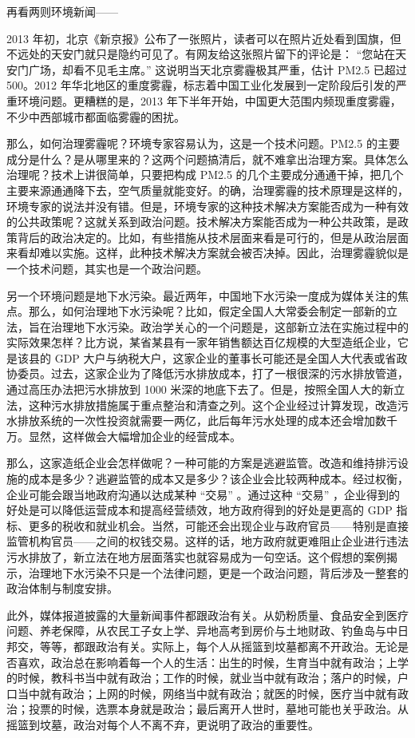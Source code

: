 再看两则环境新闻——

2013 年初，北京《新京报》公布了一张照片，读者可以在照片近处看到国旗，但不远处的天安门就只是隐约可见了。有网友给这张照片留下的评论是： “您站在天安门广场，却看不见毛主席。” 这说明当天北京雾霾极其严重，估计 PM2.5 已超过 500。2012 年华北地区的重度雾霾，标志着中国工业化发展到一定阶段后引发的严重环境问题。更糟糕的是，2013 年下半年开始，中国更大范围内频现重度雾霾，不少中西部城市都面临雾霾的困扰。

那么，如何治理雾霾呢？环境专家容易认为，这是一个技术问题。PM2.5 的主要成分是什么？是从哪里来的？这两个问题搞清后，就不难拿出治理方案。具体怎么治理呢？技术上讲很简单，只要把构成 PM2.5 的几个主要成分通通干掉，把几个主要来源通通降下去，空气质量就能变好。的确，治理雾霾的技术原理是这样的，环境专家的说法并没有错。但是，环境专家的这种技术解决方案能否成为一种有效的公共政策呢？这就关系到政治问题。技术解决方案能否成为一种公共政策，是政策背后的政治决定的。比如，有些措施从技术层面来看是可行的，但是从政治层面来看却难以实施。这样，此种技术解决方案就会被否决掉。因此，治理雾霾貌似是一个技术问题，其实也是一个政治问题。

另一个环境问题是地下水污染。最近两年，中国地下水污染一度成为媒体关注的焦点。那么，如何治理地下水污染呢？比如，假定全国人大常委会制定一部新的立法，旨在治理地下水污染。政治学关心的一个问题是，这部新立法在实施过程中的实际效果怎样？比方说，某省某县有一家年销售额达百亿规模的大型造纸企业，它是该县的 GDP 大户与纳税大户，这家企业的董事长可能还是全国人大代表或省政协委员。过去，这家企业为了降低污水排放成本，打了一根很深的污水排放管道，通过高压办法把污水排放到 1000 米深的地底下去了。但是，按照全国人大的新立法，这种污水排放措施属于重点整治和清查之列。这个企业经过计算发现，改造污水排放系统的一次性投资就需要一两亿，此后每年污水处理的成本还会增加数千万。显然，这样做会大幅增加企业的经营成本。

那么，这家造纸企业会怎样做呢？一种可能的方案是逃避监管。改造和维持排污设施的成本是多少？逃避监管的成本又是多少？该企业会比较两种成本。经过权衡，企业可能会跟当地政府沟通以达成某种 “交易” 。通过这种 “交易” ，企业得到的好处是可以降低运营成本和提高经营绩效，地方政府得到的好处是更高的 GDP 指标、更多的税收和就业机会。当然，可能还会出现企业与政府官员——特别是直接监管机构官员——之间的权钱交易。这样的话，地方政府就更难阻止企业进行违法污水排放了，新立法在地方层面落实也就容易成为一句空话。这个假想的案例揭示，治理地下水污染不只是一个法律问题，更是一个政治问题，背后涉及一整套的政治体制与制度安排。

此外，媒体报道披露的大量新闻事件都跟政治有关。从奶粉质量、食品安全到医疗问题、养老保障，从农民工子女上学、异地高考到房价与土地财政、钓鱼岛与中日邦交，等等，都跟政治有关。实际上，每个人从摇篮到坟墓都离不开政治。无论是否喜欢，政治总在影响着每一个人的生活：出生的时候，生育当中就有政治；上学的时候，教科书当中就有政治；工作的时候，就业当中就有政治；落户的时候，户口当中就有政治；上网的时候，网络当中就有政治；就医的时候，医疗当中就有政治；投票的时候，选票本身就是政治；最后离开人世时，墓地可能也关乎政治。从摇篮到坟墓，政治对每个人不离不弃，更说明了政治的重要性。

